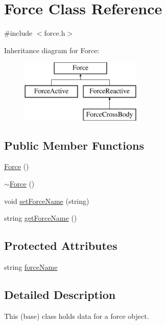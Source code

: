 \hypertarget{class_force}{\section{Force Class Reference}
\label{class_force}
}


{\ttfamily \#include $<$force.\-h$>$}

Inheritance diagram for Force\-:\begin{figure}[H]
\begin{center}
\leavevmode
\includegraphics[height=3.000000cm]{class_force}
\end{center}
\end{figure}
\subsection*{Public Member Functions}
\begin{DoxyCompactItemize}
\item 
\hyperlink{class_force_a00983e3bbc206a00bb9253deafc4e424}{Force} ()
\item 
\hyperlink{class_force_a8767ca332cee738a462befe1bfbfa454}{$\sim$\-Force} ()
\item 
void \hyperlink{class_force_aefb0b71694f6ffbfe1ee06516f5536c3}{set\-Force\-Name} (string)
\item 
string \hyperlink{class_force_a8431fcc0edd27e3edb77f8176bec6908}{get\-Force\-Name} ()
\end{DoxyCompactItemize}
\subsection*{Protected Attributes}
\begin{DoxyCompactItemize}
\item 
string \hyperlink{class_force_a50b8739b17f549bd250936b0251ca571}{force\-Name}
\end{DoxyCompactItemize}


\subsection{Detailed Description}
This (base) class holds data for a force object. 

